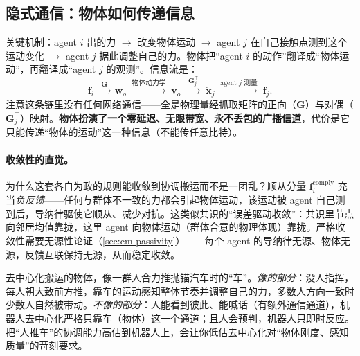\subsection{隐式通信：物体如何传递信息}
\label{sec:cm-decentral-implicit}
关键机制：agent $i$ 出的力 $\to$ 改变物体运动 $\to$ agent $j$ 在自己接触点测到这个运动变化 $\to$ agent $j$ 据此调整自己的力。物体把“agent $i$ 的动作”翻译成“物体运动”，再翻译成“agent $j$ 的观测”。信息流是：
\begin{equation}
  \mathbf{f}_i\;\xrightarrow{\;\mathbf{G}\;}\;\mathbf{w}_o\;\xrightarrow{\text{物体动力学}}\;\mathbf{v}_o\;\xrightarrow{\;\mathbf{G}_j^\top\;}\;\dot{\mathbf{x}}_j\;\xrightarrow{\text{agent }j\text{ 测量}}\;\mathbf{f}_j.
  \label{eq:cm-implicit-flow}
\end{equation}
注意这条链里没有任何网络通信——全是物理量经抓取矩阵的正向（$\mathbf{G}$）与对偶（$\mathbf{G}_j^\top$）映射。\textbf{物体扮演了一个零延迟、无限带宽、永不丢包的广播信道}，代价是它只能传递“物体的运动”这一种信息（不能传任意比特）。

\paragraph{收敛性的直觉。}
为什么这套各自为政的规则能收敛到协调搬运而不是一团乱？顺从分量 $\mathbf{f}_i^{\text{comply}}$ 充当\emph{负反馈}——任何与群体不一致的力都会引起物体运动，该运动被 agent 自己测到后，导纳律驱使它顺从、减少对抗。这类似共识的“误差驱动收敛”：共识里节点向邻居均值靠拢，这里 agent 向物体运动（群体合意的物理体现）靠拢。严格收敛性需要无源性论证（\cref{sec:cm-passivity}）——每个 agent 的导纳律无源、物体无源，反馈互联保持无源，从而稳定收敛。

\begin{note}
去中心化搬运的物体，像一群人合力推抛锚汽车时的“车”。\emph{像的部分}：没人指挥，每人朝大致前方推，靠车的运动感知整体节奏并调整自己的力，多数人方向一致时少数人自然被带动。\emph{不像的部分}：人能看到彼此、能喊话（有额外通信通道），机器人去中心化严格只靠车（物体）这一个通道；且人会预判，机器人只即时反应。把“人推车”的协调能力高估到机器人上，会让你低估去中心化对“物体刚度、感知质量”的苛刻要求。
\end{note}

